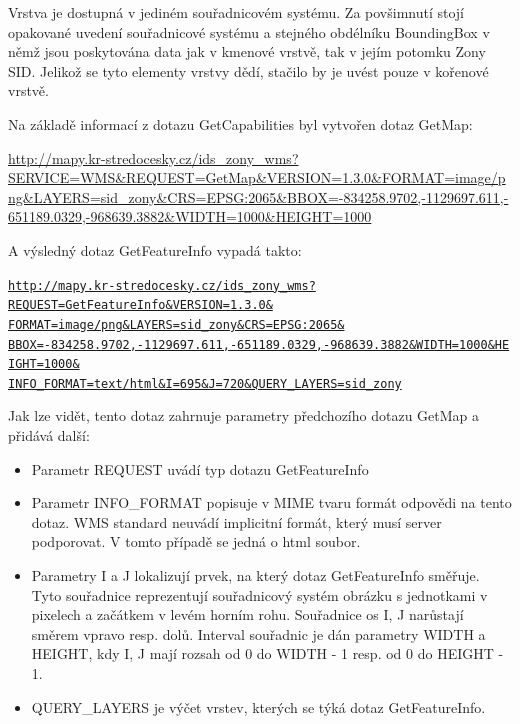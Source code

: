 \documentclass[a4paper,12pt]{article}
\begin{document}
Vrstva je dostupná v jediném souřadnicovém systému. Za povšimnutí stojí opakované uvedení souřadnicové systému a stejného obdélníku BoundingBox v němž jsou poskytována data jak v kmenové vrstvě, tak v jejím potomku Zony SID. Jelikož se tyto elementy vrstvy dědí, stačilo by je uvést pouze v kořenové vrstvě.

Na základě informací z dotazu GetCapabilities byl vytvořen dotaz GetMap: 

\url{http://mapy.kr-stredocesky.cz/ids_zony_wms?SERVICE=WMS&REQUEST=GetMap&VERSION=1.3.0&FORMAT=image/png&LAYERS=sid_zony&CRS=EPSG:2065&BBOX=-834258.9702,-1129697.611,-651189.0329,-968639.3882&WIDTH=1000&HEIGHT=1000}

A výsledný dotaz GetFeatureInfo vypadá takto:
\newcommand{\StredoceskyGetFeatureInfo}{http://mapy.kr-stredocesky.cz/ids_zony_wms?REQUEST=GetFeatureInfo&VERSION=1.3.0&FORMAT=image/png&LAYERS=sid_zony&CRS=EPSG:2065&BBOX=-834258.9702,-1129697.611,-651189.0329,-968639.3882&WIDTH=1000&HEIGHT=1000&INFO_FORMAT=text/html&I=695&J=720&QUERY_LAYERS=sid_zony}
\begin{alltt}\footnotesize
\href{\StredoceskyGetFeatureInfo}{http://mapy.kr-stredocesky.cz/ids\_zony\_wms?}
\href{\StredoceskyGetFeatureInfo}{REQUEST=GetFeatureInfo\&VERSION=1.3.0\&}
\href{\StredoceskyGetFeatureInfo}{FORMAT=image/png\&LAYERS=sid\_zony\&CRS=EPSG:2065\&}
\href{\StredoceskyGetFeatureInfo}{BBOX=-834258.9702,-1129697.611,-651189.0329,-968639.3882\&WIDTH=1000\&HEIGHT=1000\&}
\href{\StredoceskyGetFeatureInfo}{INFO\_FORMAT=text/html\&I=695\&J=720\&QUERY\_LAYERS=sid\_zony}
\end{alltt}


Jak lze vidět, tento dotaz zahrnuje parametry předchozího dotazu GetMap a přidává další:
\begin{itemize}
  \item Parametr REQUEST uvádí typ dotazu GetFeatureInfo 
  \item Parametr INFO\_FORMAT popisuje v MIME tvaru formát odpovědi na tento dotaz. WMS standard neuvádí implicitní formát, který musí server podporovat. V tomto případě se jedná o html soubor. 
  \item Parametry I a J lokalizují prvek, na který dotaz GetFeatureInfo směřuje. Tyto souřadnice reprezentují souřadnicový systém obrázku s jednotkami v pixelech a začátkem v levém horním rohu. Souřadnice os I, J narůstají  
        směrem vpravo resp. dolů. Interval souřadnic je dán parametry WIDTH a HEIGHT, kdy I, J mají rozsah od 0 do WIDTH - 1 resp. od 0 do HEIGHT - 1.  
  \item QUERY\_LAYERS je výčet vrstev, kterých se týká dotaz GetFeatureInfo. 
\end{itemize}
\end{document}
